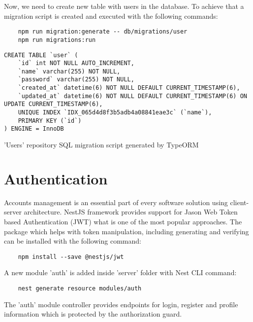 Now, we need to create new table with users in the database. To achieve that a migration script is created and executed with the following commands:

\begin{verbatim}
    npm run migration:generate -- db/migrations/user
    npm run migrations:run
\end{verbatim}

\begin{listing}[H]
\begin{verbatim}
CREATE TABLE `user` (
    `id` int NOT NULL AUTO_INCREMENT,
    `name` varchar(255) NOT NULL,
    `password` varchar(255) NOT NULL,
    `created_at` datetime(6) NOT NULL DEFAULT CURRENT_TIMESTAMP(6),
    `updated_at` datetime(6) NOT NULL DEFAULT CURRENT_TIMESTAMP(6) ON UPDATE CURRENT_TIMESTAMP(6),
    UNIQUE INDEX `IDX_065d4d8f3b5adb4a08841eae3c` (`name`),
    PRIMARY KEY (`id`)
) ENGINE = InnoDB
\end{verbatim}
\caption[TypeORM SQL migration script]{'Users' repository SQL migration script generated by TypeORM}
\end{listing}




\section{{Authentication}}%
\label{sec:authentication}

Accounts management is an essential part of every software solution using client-server architecture. NestJS framework provides support for Jason Web Token based Authentication (JWT) \autocite{JWT} what is one of the most popular approaches. The package which helps with token manipulation, including generating and verifying can be installed with the following command:

\begin{verbatim}
    npm install --save @nestjs/jwt
\end{verbatim}

A new module 'auth' is added inside 'server' folder with Nest CLI command:
\begin{verbatim}
    nest generate resource modules/auth
\end{verbatim}

The 'auth' module controller provides endpoints for login, register and profile information which is protected by the authorization guard.

